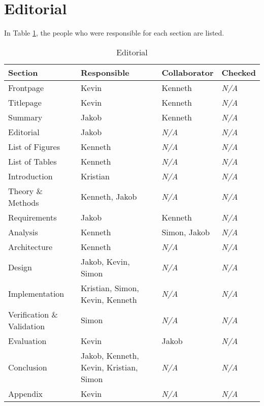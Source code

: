\section{Editorial}
In Table \ref{table:editorial}, the people who were responsible for each section
are listed.
\begin{table}[ht]
    \begin{tabularx}{\textwidth}{|>{\RaggedRight}X|>{\RaggedRight}X|>{\RaggedRight}X|>{\RaggedRight}X|}
        \hline
        \textbf{Section} & \textbf{Responsible} & \textbf{Collaborator} & \textbf{Checked}\\
        \hline
        Frontpage & Kevin & Kenneth & \textit{N/A}\\
        \hline
        Titlepage & Kevin & Kenneth & \textit{N/A}\\
        \hline
        Summary & Jakob & Kenneth & \textit{N/A}\\
        \hline
        Editorial & Jakob & \textit{N/A} & \textit{N/A}\\
        \hline
        List of Figures & Kenneth & \textit{N/A} & \textit{N/A}\\
        \hline
        List of Tables & Kenneth & \textit{N/A} & \textit{N/A}\\
        \hline
        Introduction & Kristian & \textit{N/A} & \textit{N/A}\\
        \hline
        Theory \& Methods & Kenneth, Jakob & \textit{N/A} & \textit{N/A}\\
        \hline
        Requirements & Jakob & Kenneth & \textit{N/A}\\
        \hline
        Analysis & Kenneth & Simon, Jakob & \textit{N/A}\\
        \hline
        Architecture & Kenneth & \textit{N/A} & \textit{N/A}\\
        \hline
        Design & Jakob, Kevin, Simon & \textit{N/A} & \textit{N/A}\\
        \hline
        Implementation & Kristian, Simon, Kevin, Kenneth & \textit{N/A} & \textit{N/A}\\
        \hline
        Verification \& Validation & Simon & \textit{N/A} & \textit{N/A}\\
        \hline
        Evaluation & Kevin & Jakob & \textit{N/A}\\
        \hline
        Conclusion & Jakob, Kenneth, Kevin, Kristian, Simon & \textit{N/A} & \textit{N/A}\\
        \hline
        Appendix & Kevin & \textit{N/A} & \textit{N/A}\\
        \hline
    \end{tabularx}
    \caption{Editorial} 
    \label{table:editorial}
\end{table} 
